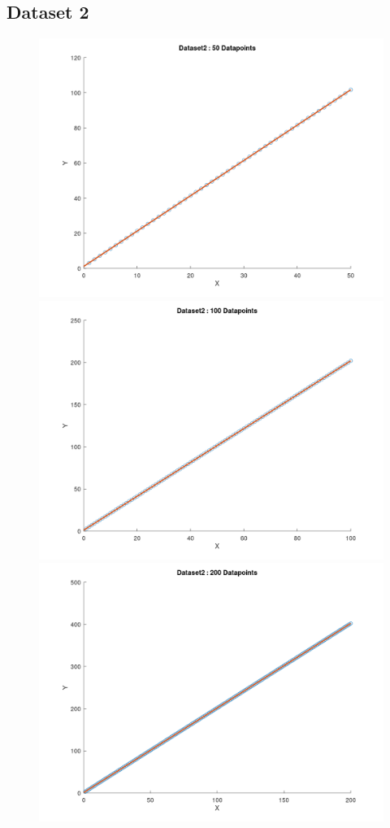 \documentclass{article}
\begin{document}
\subsection{Dataset 2}
\begin{figure} [!ht]
	\includegraphics[width=.55\textwidth]{D2-50.png}\hfill
	\includegraphics[width=.55\textwidth]{D2-100.png}\hfill
	\includegraphics[width=1\textwidth]{D2-200.png}
	\label{fig:plots2}
\end{figure}
\pagebreak
\end{document}
